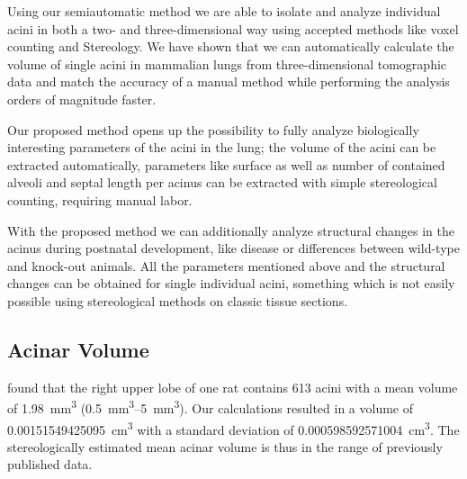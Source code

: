 \documentclass[twoside,paper=a4,abstract=true,english,DIV=calc]{scrartcl}
\newcommand{\meanacinarvolume}{0.00151549425095} %
\newcommand{\std}{0.000598592571004} %
\begin{document}
Using our semiautomatic method we are able to isolate and analyze individual acini in both a two- and three-dimensional way using accepted methods like voxel counting and Stereology.
We have shown that we can automatically calculate the volume of single acini in mammalian lungs from three-dimensional tomographic data and match the accuracy of a manual method while performing the analysis orders of magnitude faster.

Our proposed method opens up the possibility to fully analyze biologically interesting parameters of the acini in the lung; the volume of the acini can be extracted automatically, parameters like surface as well as number of contained alveoli and septal length per acinus can be extracted with simple stereological counting, requiring manual labor.

With the proposed method we can additionally analyze structural changes in the acinus during postnatal development, like disease or differences between wild-type and knock-out animals.
All the parameters mentioned above and the structural changes can be obtained for single individual acini, something which is not easily possible using stereological methods on classic tissue sections.

\subsection{Acinar Volume}
\citet[Table 1]{Rodriguez1987} found that the right upper lobe of one rat contains 613 acini with a mean volume of \SI{1.98}{\milli\meter\cubed} (\SIrange{0.5}{5}{\milli\meter\cubed}).
Our calculations resulted in a volume of \SI{\meanacinarvolume}{\cubic\centi\meter} with a standard deviation of \SI{\std}{\cubic\centi\meter}.
The stereologically estimated mean acinar volume is thus in the range of previously published data.
\end{document}
